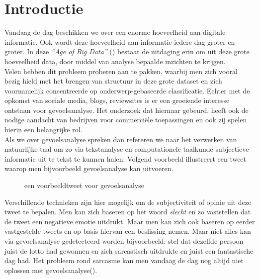 \chapter{Introductie}\label{introductie}

Vandaag de dag beschikken we over een enorme hoeveelheid aan digitale informatie. Ook wordt deze hoeveelheid aan informatie iedere dag groter en groter. 
In deze \textit{``Age of Big Data''} (\cite{lohr2012age}) bestaat de uitdaging erin om uit deze grote hoeveelheid data, door middel van analyse bepaalde inzichten te krijgen.
\\
Velen hebben dit probleem proberen aan te pakken, waarbij men zich vooral bezig hield met het brengen van structuur in deze grote dataset en zich voornamelijk concentreerde op onderwerp-gebaseerde classificatie. Echter met de opkomst van sociale media, blogs, reviewsites is er een groeiende interesse ontstaan voor gevoelsanalyse. Het onderzoek dat hiernaar gebeurd, heeft ook de nodige aandacht van bedrijven voor commerci\"ele toepassingen en ook zij spelen hierin een belangrijke rol.\\
Als we over gevoelsanalyse spreken dan refereren we naar het verwerken van natuurlijke taal  om zo via tekstanalyse en computationele taalkunde subjectieve informatie uit te tekst te kunnen halen. Volgend voorbeeld illustreert een tweet waarop men bijvoorbeeld gevoelsanalyse kan uitvoeren.\\

\begin{figure}[h]%
    \centering
    \caption{een voorbeeldtweet voor gevoelsanalyse}%
\end{figure}

Verschillende technieken zijn hier mogelijk om de subjectiviteit of opinie uit deze tweet te bepalen. Men kan zich baseren op het woord \textit{slecht} en zo vaststellen dat de tweet een negatieve emotie uitdrukt. Maar men kan zich ook baseren op eerder vastgestelde tweets en op basis hiervan een beslissing nemen. Maar niet alles kan via gevoelsanalyse gedetecteerd worden bijvoorbeeld: stel dat dezelfde persoon juist de lotto had gewonnen en zich sarcastisch uitdrukte en juist een fantastische dag had. Het probleem rond sarcasme kan men vandaag de dag nog altijd niet oplossen met gevoelsanalyse(\cite{liebrecht2013perfect}).\\ 

